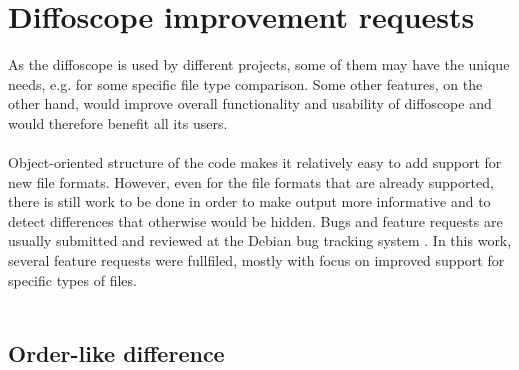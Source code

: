 \section{Diffoscope improvement requests}


As the diffoscope is used by different projects, some of them may have the unique needs, e.g. for some specific file type comparison.
Some other features, on the other hand, would improve overall functionality and usability of diffoscope and would therefore benefit all its users.\\\\
Object-oriented structure of the code makes it relatively easy to add support for
new file formats.
However, even for the file formats that are already supported, there is still work
to be done in order to make output more informative and to detect differences that
otherwise would be hidden.
Bugs and feature requests are usually submitted and reviewed at the Debian bug tracking system \autocite{dfs-bugs}.
In this work, several feature requests were fullfiled, mostly with focus on improved support for specific types of files.\\\\


\subsection[Order-like difference]{Order-like difference}


